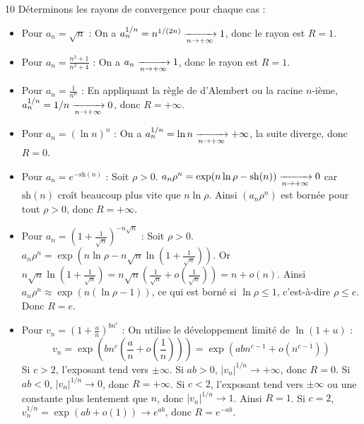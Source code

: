 \begin{correction}{10}
Déterminons les rayons de convergence pour chaque cas :
\begin{itemize}
 \item Pour $a_n = \sqrt{n}$ : On a $a_n^{1/n} = n^{1/(2n)} \xrightarrow[n \to +\infty]{} 1$, donc le rayon est $R=1$. 
 \item Pour $a_n = \frac{n^2+1}{n^2+4}$ : On a $a_n \xrightarrow[n \to +\infty]{} 1$, donc le rayon est $R=1$. 
 \item Pour $a_n = \frac{1}{n^n}$ : En appliquant la règle de d'Alembert ou la racine $n$-ième, $a_n^{1/n} = 1/n \xrightarrow[n \to +\infty]{} 0$, donc $R=+\infty$. 
 \item Pour $a_n = (\ln n)^n$ : On a $a_n^{1/n} = \ln n \xrightarrow[n \to +\infty]{} +\infty$, la suite diverge, donc $R=0$. 
 \item Pour $a_n = e^{-\mathrm{sh}(n)}$ : Soit $\rho>0$. $a_n \rho^n = \exp(n\ln \rho - \mathrm{sh}(n)) \xrightarrow[n \to +\infty]{} 0$ car $\mathrm{sh}(n)$ croît beaucoup plus vite que $n\ln \rho$. Ainsi $(a_n \rho^n)$ est bornée pour tout $\rho>0$, donc $R=+\infty$. 
 \item Pour $a_n = \left(1+\frac{1}{\sqrt{n}}\right)^{-n\sqrt{n}}$ : Soit $\rho>0$. $a_n \rho^n = \exp\left(n\ln \rho - n\sqrt{n}\ln\left(1+\frac{1}{\sqrt{n}}\right)\right)$. Or $n\sqrt{n}\ln\left(1+\frac{1}{\sqrt{n}}\right) = n\sqrt{n}\left(\frac{1}{\sqrt{n}} + o\left(\frac{1}{\sqrt{n}}\right)\right) = n + o(n)$. Ainsi $a_n \rho^n \approx \exp(n(\ln \rho - 1))$, ce qui est borné si $\ln \rho \le 1$, c'est-à-dire $\rho \le e$. Donc $R=e$. 
 \item Pour $v_n = \left(1+\frac{a}{n}\right)^{bn^c}$ : 
 On utilise le développement limité de $\ln(1+u)$ : 
 $$ v_n = \exp\left( b n^c \left( \frac{a}{n} + o\left(\frac{1}{n}\right) \right) \right) = \exp\left( ab n^{c-1} + o(n^{c-1}) \right) $$ 
 Si $c > 2$, l'exposant tend vers $\pm \infty$. Si $ab > 0$, $|v_n|^{1/n} \to +\infty$, donc $R=0$. Si $ab < 0$, $|v_n|^{1/n} \to 0$, donc $R=+\infty$. 
 Si $c < 2$, l'exposant tend vers $\pm\infty$ ou une constante plus lentement que $n$, donc $|v_n|^{1/n} \to 1$. Ainsi $R=1$. 
 Si $c = 2$, $v_n^{1/n} = \exp(ab + o(1)) \to e^{ab}$, donc $R = e^{-ab}$. 
\end{itemize}
\end{correction}

